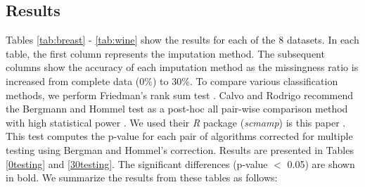 \documentclass{iosart2c}
\begin{document}
\subsection{Results}

Tables \ref{tab:breast} - \ref{tab:wine} show the results for each of the $8$ datasets. In each table, the first column represents the imputation method. The subsequent columns show the accuracy of each imputation method as the missingness ratio is increased from complete data ($0\%$) to $30\%$. To compare various classification methods, we perform Friedman's rank sum test \cite{Demsar:2006:SCC:1248547.1248548}. Calvo and Rodrigo recommend the Bergmann and Hommel test as a post-hoc all pair-wise comparison method with high statistical power \cite{statisticaltest}. We used their \textit{R} package (\textit{scmamp}) is this paper \cite{statisticaltestpackage}. This test computes the p-value for each pair of algorithms corrected for multiple testing using Bergman and Hommel's correction. Results are presented in Tables \ref{0testing} and \ref{30testing}. The significant differences (p-value $<$ 0.05) are shown in bold. We summarize the results from these tables as follows:
\end{document}
